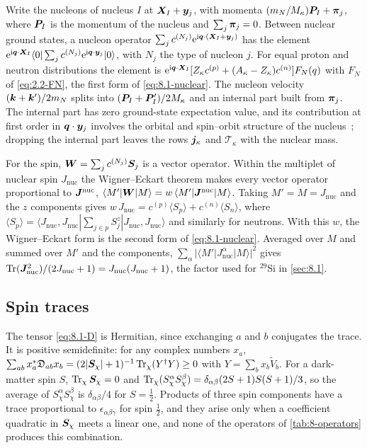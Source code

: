 Write the nucleons of nucleus $I$ at $\bm{X}_I + \bm{y}_j$, with momenta $(m_N/M_\kappa)\bm{P}_I + \bm{\pi}_j$, where $\bm{P}_I$ is the momentum of the nucleus and $\sum_j\bm{\pi}_j = 0$. Between nuclear ground states, a nucleon operator $\sum_j c^{(N_j)}\mathrm{e}^{\mathrm{i}\bm{q}\cdot(\bm{X}_I + \bm{y}_j)}$ has the element $\mathrm{e}^{\mathrm{i}\bm{q}\cdot\bm{X}_I}\langle0|\sum_jc^{(N_j)}\mathrm{e}^{\mathrm{i}\bm{q}\cdot\bm{y}_j}|0\rangle$, with $N_j$ the type of nucleon $j$. For equal proton and neutron distributions the element is $\mathrm{e}^{\mathrm{i}\bm{q}\cdot\bm{X}_I}[Z_\kappa c^{(p)} + (A_\kappa - Z_\kappa)c^{(n)}]F_N(q)$ with $F_N$ of \cref{eq:2.2-FN}, the first form of \cref{eq:8.1-nuclear}. The nucleon velocity $(\bm{k} + \bm{k}')/2m_N$ splits into $(\bm{P}_I + \bm{P}'_I)/2M_\kappa$ and an internal part built from $\bm{\pi}_j$. The internal part has zero ground-state expectation value, and its contribution at first order in $\bm{q}\cdot\bm{y}_j$ involves the orbital and spin--orbit structure of the nucleus~\cite[Eqs.~(26) and (27)]{fitzpatrick2013effective}; dropping the internal part leaves the rows $\bm{j}_\kappa$ and $\mathcal{T}_\kappa$ with the nuclear mass.

For the spin, $\bm{W} = \sum_jc^{(N_j)}\bm{S}_j$ is a vector operator. Within the multiplet of nuclear spin $J_{\mathrm{nuc}}$ the Wigner--Eckart theorem makes every vector operator proportional to $\bm{J}^{\mathrm{nuc}}$, $\langle M'|\bm{W}|M\rangle = w\,\langle M'|\bm{J}^{\mathrm{nuc}}|M\rangle$. Taking $M' = M = J_{\mathrm{nuc}}$ and the $z$ components gives $w\,J_{\mathrm{nuc}} = c^{(p)}\langle S_p\rangle + c^{(n)}\langle S_n\rangle$, where $\langle S_p\rangle = \langle J_{\mathrm{nuc}}, J_{\mathrm{nuc}}|\sum_{j\in p}S^z_j|J_{\mathrm{nuc}}, J_{\mathrm{nuc}}\rangle$ and similarly for neutrons. With this $w$, the Wigner--Eckart form is the second form of \cref{eq:8.1-nuclear}. Averaged over $M$ and summed over $M'$ and the components, $\sum_\alpha|\langle M'|J^\alpha_{\mathrm{nuc}}|M\rangle|^2$ gives $\operatorname{Tr}(\bm{J}^2_{\mathrm{nuc}})/(2J_{\mathrm{nuc}} + 1) = J_{\mathrm{nuc}}(J_{\mathrm{nuc}} + 1)$, the factor used for $^{29}$Si in \cref{sec:8.1}.

\subsection{Spin traces}

The tensor \cref{eq:8.1-D} is Hermitian, since exchanging $a$ and $b$ conjugates the trace. It is positive semidefinite: for any complex numbers $x_a$, $\sum_{ab}x_a^*\mathfrak{D}_{ab}x_b = (2|\bm{S}_\chi| + 1)^{-1}\operatorname{Tr}_\chi(Y^\dagger Y) \ge 0$ with $Y = \sum_bx_b\tilde V_b$. For a dark-matter spin $S$, $\operatorname{Tr}_\chi\bm{S}_\chi = 0$ and $\operatorname{Tr}_\chi(S^\alpha_\chi S^\beta_\chi) = \delta_{\alpha\beta}(2S + 1)S(S + 1)/3$, so the average of $S^\alpha_\chi S^\beta_\chi$ is $\delta_{\alpha\beta}/4$ for $S = \frac12$. Products of three spin components have a trace proportional to $\epsilon_{\alpha\beta\gamma}$ for spin $\frac12$, and they arise only when a coefficient quadratic in $\bm{S}_\chi$ meets a linear one, and none of the operators of \cref{tab:8-operators} produces this combination.

